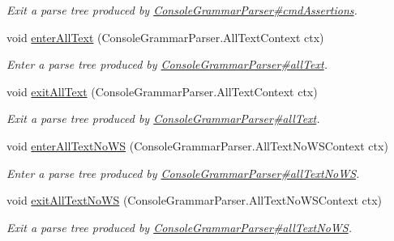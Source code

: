 \begin{DoxyCompactItemize}
\begin{DoxyCompactList}\small\item\em Exit a parse tree produced by \hyperlink{classgov_1_1nasa_1_1jpf_1_1inspector_1_1client_1_1parser_1_1_console_grammar_parser_aad29008053f0b40d17bf6e3e929b9b11}{Console\+Grammar\+Parser\#cmd\+Assertions}. \end{DoxyCompactList}\item 
void \hyperlink{interfacegov_1_1nasa_1_1jpf_1_1inspector_1_1client_1_1parser_1_1_console_grammar_listener_adaa63c7630e1f8dee7f47d2e1575f530}{enter\+All\+Text} (Console\+Grammar\+Parser.\+All\+Text\+Context ctx)
\begin{DoxyCompactList}\small\item\em Enter a parse tree produced by \hyperlink{classgov_1_1nasa_1_1jpf_1_1inspector_1_1client_1_1parser_1_1_console_grammar_parser_a9dfaeb28734c8b3f7ec5a7b81ed7d42e}{Console\+Grammar\+Parser\#all\+Text}. \end{DoxyCompactList}\item 
void \hyperlink{interfacegov_1_1nasa_1_1jpf_1_1inspector_1_1client_1_1parser_1_1_console_grammar_listener_ae417a7fd2dfe34f00b2b94aa3c721ac1}{exit\+All\+Text} (Console\+Grammar\+Parser.\+All\+Text\+Context ctx)
\begin{DoxyCompactList}\small\item\em Exit a parse tree produced by \hyperlink{classgov_1_1nasa_1_1jpf_1_1inspector_1_1client_1_1parser_1_1_console_grammar_parser_a9dfaeb28734c8b3f7ec5a7b81ed7d42e}{Console\+Grammar\+Parser\#all\+Text}. \end{DoxyCompactList}\item 
void \hyperlink{interfacegov_1_1nasa_1_1jpf_1_1inspector_1_1client_1_1parser_1_1_console_grammar_listener_a86566f0470b9e5fd1137625923d1f20d}{enter\+All\+Text\+No\+WS} (Console\+Grammar\+Parser.\+All\+Text\+No\+W\+S\+Context ctx)
\begin{DoxyCompactList}\small\item\em Enter a parse tree produced by \hyperlink{classgov_1_1nasa_1_1jpf_1_1inspector_1_1client_1_1parser_1_1_console_grammar_parser_ac1f61b1a3d9917fc0f0920f3274d5b22}{Console\+Grammar\+Parser\#all\+Text\+No\+WS}. \end{DoxyCompactList}\item 
void \hyperlink{interfacegov_1_1nasa_1_1jpf_1_1inspector_1_1client_1_1parser_1_1_console_grammar_listener_afb39cbc42b769e122e64b0371a00c39d}{exit\+All\+Text\+No\+WS} (Console\+Grammar\+Parser.\+All\+Text\+No\+W\+S\+Context ctx)
\begin{DoxyCompactList}\small\item\em Exit a parse tree produced by \hyperlink{classgov_1_1nasa_1_1jpf_1_1inspector_1_1client_1_1parser_1_1_console_grammar_parser_ac1f61b1a3d9917fc0f0920f3274d5b22}{Console\+Grammar\+Parser\#all\+Text\+No\+WS}. \end{DoxyCompactList}\item 

\end{DoxyCompactItemize}
